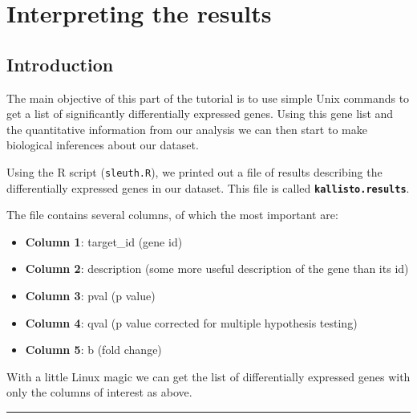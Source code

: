 \documentclass[11pt]{article}
\providecommand{\tightlist}{%
      \setlength{\itemsep}{0pt}\setlength{\parskip}{0pt}}
\begin{document}

\newpage





    \hypertarget{interpreting-the-results}{%
\section{Interpreting the results}\label{interpreting-the-results}}

    \hypertarget{introduction}{%
\subsection{Introduction}\label{introduction}}

The main objective of this part of the tutorial is to use simple Unix
commands to get a list of significantly differentially expressed genes.
Using this gene list and the quantitative information from our analysis
we can then start to make biological inferences about our dataset.

Using the R script (\texttt{sleuth.R}), we printed out a file of results
describing the differentially expressed genes in our dataset. This file
is called \textbf{\texttt{kallisto.results}}.

The file contains several columns, of which the most important are:

\begin{itemize}
\tightlist
\item
  \textbf{Column 1}: target\_id (gene id)\\
\item
  \textbf{Column 2}: description (some more useful description of the
  gene than its id)\\
\item
  \textbf{Column 3}: pval (p value)\\
\item
  \textbf{Column 4}: qval (p value corrected for multiple hypothesis
  testing)\\
\item
  \textbf{Column 5}: b (fold change)
\end{itemize}

With a little Linux magic we can get the list of differentially
expressed genes with only the columns of interest as above.

    \begin{center}\rule{0.5\linewidth}{.4pt}\end{center}
\end{document}
